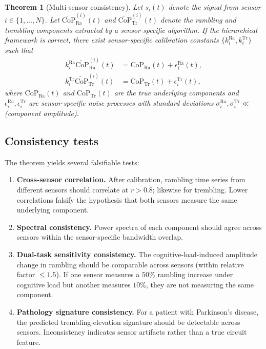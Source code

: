 \documentclass[11pt,twocolumn,a4paper]{article}
\newtheorem{theorem}{Theorem}[section]
\theoremstyle{definition}
\theoremstyle{remark}
\newcommand{\Ra}{\mathrm{Ra}}
\newcommand{\Tr}{\mathrm{Tr}}
\begin{document}
\begin{theorem}[Multi-sensor consistency]
\label{thm:consistency}
Let $s_i(t)$ denote the signal from sensor $i \in \{1, \ldots, N\}$.
Let $\tilde{\mathrm{CoP}}_{\Ra}^{(i)}(t)$ and
$\tilde{\mathrm{CoP}}_{\Tr}^{(i)}(t)$ denote the rambling and
trembling components extracted by a sensor-specific algorithm. If
the hierarchical framework is correct, there exist
sensor-specific calibration constants $\{k_i^{\Ra},
k_i^{\Tr}\}$ such that
\begin{align}
k_i^{\Ra} \tilde{\mathrm{CoP}}_{\Ra}^{(i)}(t)
 &= \mathrm{CoP}_{\Ra}(t) + \epsilon_i^{\Ra}(t), \\
k_i^{\Tr} \tilde{\mathrm{CoP}}_{\Tr}^{(i)}(t)
 &= \mathrm{CoP}_{\Tr}(t) + \epsilon_i^{\Tr}(t),
\end{align}
where $\mathrm{CoP}_{\Ra}(t)$ and $\mathrm{CoP}_{\Tr}(t)$ are the
true underlying components and $\epsilon_i^{\Ra}, \epsilon_i^{\Tr}$
are sensor-specific noise processes with standard deviations
$\sigma_i^{\Ra}, \sigma_i^{\Tr} \ll$ (component amplitude).
\end{theorem}

\subsection{Consistency tests}

The theorem yields several falsifiable tests:

\begin{enumerate}[leftmargin=*,itemsep=1pt]
\item \textbf{Cross-sensor correlation.} After calibration,
rambling time series from different sensors should correlate at
$r > 0.8$; likewise for trembling. Lower correlations falsify
the hypothesis that both sensors measure the same underlying
component.
\item \textbf{Spectral consistency.} Power spectra of each
component should agree across sensors within the sensor-specific
bandwidth overlap.
\item \textbf{Dual-task sensitivity consistency.} The
cognitive-load-induced amplitude change in rambling should be
comparable across sensors (within relative factor $\le 1.5$). If
one sensor measures a $50\%$ rambling increase under cognitive
load but another measures $10\%$, they are not measuring the same
component.
\item \textbf{Pathology signature consistency.} For a patient
with Parkinson's disease, the predicted trembling-elevation
signature should be detectable across sensors. Inconsistency
indicates sensor artifacts rather than a true circuit feature.
\end{enumerate}
\end{document}
